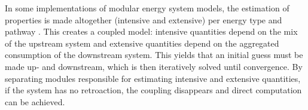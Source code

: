 \documentclass[
]{kaohandt}
\begin{document}

In some implementations of modular energy system models, the estimation of properties is made altogether (intensive and extensive) per energy type and pathway . This creates a coupled model: intensive quantities depend on the mix of the upstream system and extensive quantities depend on the aggregated consumption of the downstream system. This yields that an initial guess must be made up- and downstream, which is then iteratively solved until convergence. By separating modules responsible for estimating intensive and extensive quantities, if the system has no retroaction, the coupling disappears and direct computation can be achieved.


\end{document}
